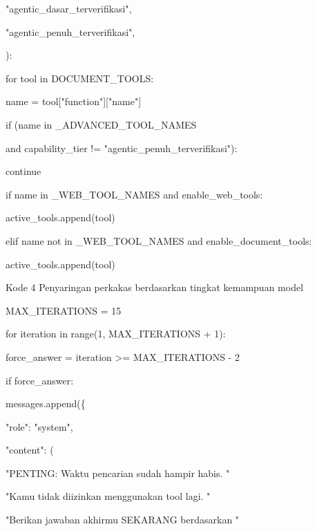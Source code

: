 \documentclass[12pt,a4paper]{article}
\begin{document}
"agentic\_dasar\_terverifikasi",



"agentic\_penuh\_terverifikasi",



):



for tool in DOCUMENT\_TOOLS:



name = tool{[}"function"{]}{[}"name"{]}



if (name in \_ADVANCED\_TOOL\_NAMES



and capability\_tier != "agentic\_penuh\_terverifikasi"):



continue



if name in \_WEB\_TOOL\_NAMES and enable\_web\_tools:



active\_tools.append(tool)



elif name not in \_WEB\_TOOL\_NAMES and enable\_document\_tools:



active\_tools.append(tool)



Kode 4	Penyaringan perkakas berdasarkan tingkat kemampuan model



MAX\_ITERATIONS = 15



for iteration in range(1, MAX\_ITERATIONS + 1):



force\_answer = iteration \textgreater{}= MAX\_ITERATIONS - 2



if force\_answer:



messages.append(\{



"role": "system",



"content": (



"PENTING: Waktu pencarian sudah hampir habis. "



"Kamu tidak diizinkan menggunakan tool lagi. "



"Berikan jawaban akhirmu SEKARANG berdasarkan "
\end{document}

